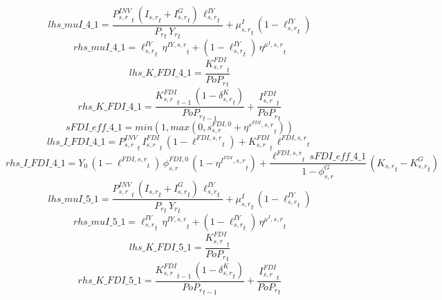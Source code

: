\begin{dmath*}
lhs\_muI\_4\_1 = \frac{{{P^{INV}_{s,r}}}_{t}\, \left({{I_{s,r}}}_{t}+{{I^G_{s,r}}}_{t}\right)\, {{\ell^{IY}_{s,r}}}_{t}}{{{P_{r}}}_{t}\, {{Y_r}}_{t}}+{{\mu^{I}_{s,r}}}_{t}\, \left(1-{{\ell^{IY}_{s,r}}}_{t}\right)
\end{dmath*}
\begin{dmath*}
rhs\_muI\_4\_1 = {{\ell^{IY}_{s,r}}}_{t}\, {{\eta^{IY,s,r}}}_{t}+\left(1-{{\ell^{IY}_{s,r}}}_{t}\right)\, {{\eta^{\mu^{I},s,r}}}_{t}
\end{dmath*}
\begin{dmath*}
lhs\_K\_FDI\_4\_1 = \frac{{{K^{FDI}_{s,r}}}_{t}}{{{PoP_r}}_{t}}
\end{dmath*}
\begin{dmath*}
rhs\_K\_FDI\_4\_1 = \frac{{{K^{FDI}_{s,r}}}_{t-1}\, \left(1-{{\delta^{K}_{s,r}}}_{t}\right)}{{{PoP_r}}_{t-1}}+\frac{{{I^{FDI}_{s,r}}}_{t}}{{{PoP_r}}_{t}}
\end{dmath*}
\begin{dmath*}
sFDI\_eff\_4\_1 = min(1,max(0,{{s^{FDI,0}_{s,r}}}+{{\eta^{s^{FDI},s,r}}}_{t}))
\end{dmath*}
\begin{dmath*}
lhs\_I\_FDI\_4\_1 = {{P^{INV}_{s,r}}}_{t}\, {{I^{FDI}_{s,r}}}_{t}\, \left(1-{{\ell^{FDI,s,r}}}_{t}\right)+{{K^{FDI}_{s,r}}}_{t}\, {{\ell^{FDI,s,r}}}_{t}
\end{dmath*}
\begin{dmath*}
rhs\_I\_FDI\_4\_1 = {{Y_0}}\, \left(1-{{\ell^{FDI,s,r}}}_{t}\right)\, {{\phi^{FDI,0}_{s,r}}}\, \left(1-{{\eta^{I^{FDI},s,r}}}_{t}\right)+\frac{{{\ell^{FDI,s,r}}}_{t}\, {sFDI\_eff\_4\_1}}{1-{{\phi^{G}_{s,r}}}}\, \left({{K_{s,r}}}_{t}-{{K^G_{s,r}}}_{t}\right)
\end{dmath*}
\begin{dmath*}
lhs\_muI\_5\_1 = \frac{{{P^{INV}_{s,r}}}_{t}\, \left({{I_{s,r}}}_{t}+{{I^G_{s,r}}}_{t}\right)\, {{\ell^{IY}_{s,r}}}_{t}}{{{P_{r}}}_{t}\, {{Y_r}}_{t}}+{{\mu^{I}_{s,r}}}_{t}\, \left(1-{{\ell^{IY}_{s,r}}}_{t}\right)
\end{dmath*}
\begin{dmath*}
rhs\_muI\_5\_1 = {{\ell^{IY}_{s,r}}}_{t}\, {{\eta^{IY,s,r}}}_{t}+\left(1-{{\ell^{IY}_{s,r}}}_{t}\right)\, {{\eta^{\mu^{I},s,r}}}_{t}
\end{dmath*}
\begin{dmath*}
lhs\_K\_FDI\_5\_1 = \frac{{{K^{FDI}_{s,r}}}_{t}}{{{PoP_r}}_{t}}
\end{dmath*}
\begin{dmath*}
rhs\_K\_FDI\_5\_1 = \frac{{{K^{FDI}_{s,r}}}_{t-1}\, \left(1-{{\delta^{K}_{s,r}}}_{t}\right)}{{{PoP_r}}_{t-1}}+\frac{{{I^{FDI}_{s,r}}}_{t}}{{{PoP_r}}_{t}}
\end{dmath*}
